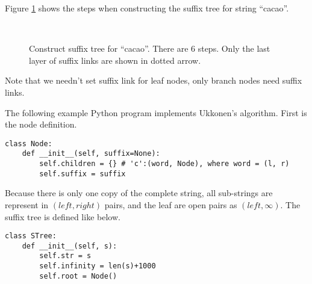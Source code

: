 \documentclass{article}
\begin{document}
Figure \ref{fig:cons-stree-cacao} shows the steps when constructing the
suffix tree for string ``cacao''.

\begin{figure}[htbp]
  \centering
   \\
  \caption{Construct suffix tree for ``cacao''. There are 6 steps. Only the last layer of suffix links are shown in dotted arrow.}
  \label{fig:cons-stree-cacao}
\end{figure}

Note that we needn't set suffix link for leaf nodes, only branch nodes
need suffix links.

The following example Python program implements Ukkonen's algorithm.
First is the node definition.

\lstset{language=Python}
\begin{lstlisting}
class Node:
    def __init__(self, suffix=None):
        self.children = {} # 'c':(word, Node), where word = (l, r)
        self.suffix = suffix
\end{lstlisting}

Because there is only one copy of the complete string, all sub-strings
are represent in $(left, right)$ pairs, and the leaf are open pairs
as $(left, \infty)$. The suffix tree is defined like below.

\begin{lstlisting}
class STree:
    def __init__(self, s):
        self.str = s
        self.infinity = len(s)+1000
        self.root = Node()
\end{lstlisting}
\end{document}
